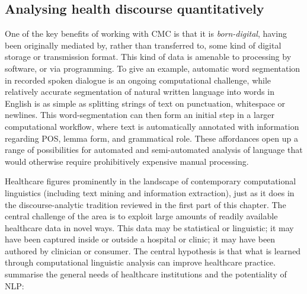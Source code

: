 \subsection{Analysing health discourse quantitatively}

One of the key benefits of working with \gls{CMC} is that it is \emph{born\hyp{}digital}, having been originally mediated by, rather than transferred to, some kind of digital storage or transmission format. This kind of data is amenable to processing by software, or via programming. To give an example, automatic word segmentation in recorded spoken dialogue is an ongoing computational challenge, while relatively accurate segmentation of natural written language into words in English is as simple as splitting strings of text on punctuation, whitespace or newlines. This word\hyp{}segmentation can then form an initial step in a larger computational workflow, where text is automatically annotated with information regarding \gls{POS}, lemma form, and grammatical role. These affordances open up a range of possibilities for automated and semi\hyp{}automated analysis of language that would otherwise require prohibitively expensive manual processing.



Healthcare figures prominently in the landscape of contemporary computational linguistics (including text mining and information extraction), just as it does in the discourse\hyp{}analytic tradition reviewed in the first part of this chapter. The central challenge of the area is to exploit large amounts of readily available healthcare data in novel ways. This data may be statistical or linguistic; it may have been captured inside or outside a hospital or clinic; it may have been authored by clinician or consumer. The central hypothesis is that what is learned through computational linguistic analysis can improve healthcare practice. \citeauthor{velupillai2015recent} summarise the general needs of healthcare institutions and the potentiality of \gls{NLP}:

